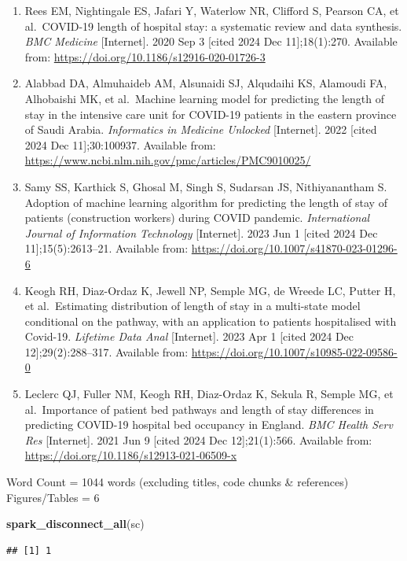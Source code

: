 \documentclass[
]{article}
\newenvironment{Shaded}{\begin{snugshade}}{\end{snugshade}}
\newcommand{\FunctionTok}[1]{\textcolor[rgb]{0.13,0.29,0.53}{\textbf{#1}}}
\newcommand{\NormalTok}[1]{#1}
\begin{document}
\begin{enumerate}
\def\labelenumi{\arabic{enumi}.}
\item
  Rees EM, Nightingale ES, Jafari Y, Waterlow NR, Clifford S, Pearson
  CA, et al.~COVID-19 length of hospital stay: a systematic review and
  data synthesis. \emph{BMC Medicine} {[}Internet{]}. 2020 Sep 3
  {[}cited 2024 Dec 11{]};18(1):270. Available from:
  \url{https://doi.org/10.1186/s12916-020-01726-3}
\item
  Alabbad DA, Almuhaideb AM, Alsunaidi SJ, Alqudaihi KS, Alamoudi FA,
  Alhobaishi MK, et al.~Machine learning model for predicting the length
  of stay in the intensive care unit for COVID-19 patients in the
  eastern province of Saudi Arabia. \emph{Informatics in Medicine
  Unlocked} {[}Internet{]}. 2022 {[}cited 2024 Dec 11{]};30:100937.
  Available from:
  \url{https://www.ncbi.nlm.nih.gov/pmc/articles/PMC9010025/}
\item
  Samy SS, Karthick S, Ghosal M, Singh S, Sudarsan JS, Nithiyanantham S.
  Adoption of machine learning algorithm for predicting the length of
  stay of patients (construction workers) during COVID pandemic.
  \emph{International Journal of Information Technology} {[}Internet{]}.
  2023 Jun 1 {[}cited 2024 Dec 11{]};15(5):2613--21. Available from:
  \url{https://doi.org/10.1007/s41870-023-01296-6}
\item
  Keogh RH, Diaz-Ordaz K, Jewell NP, Semple MG, de Wreede LC, Putter H,
  et al.~Estimating distribution of length of stay in a multi-state
  model conditional on the pathway, with an application to patients
  hospitalised with Covid-19. \emph{Lifetime Data Anal} {[}Internet{]}.
  2023 Apr 1 {[}cited 2024 Dec 12{]};29(2):288--317. Available from:
  \url{https://doi.org/10.1007/s10985-022-09586-0}
\item
  Leclerc QJ, Fuller NM, Keogh RH, Diaz-Ordaz K, Sekula R, Semple MG, et
  al.~Importance of patient bed pathways and length of stay differences
  in predicting COVID-19 hospital bed occupancy in England. \emph{BMC
  Health Serv Res} {[}Internet{]}. 2021 Jun 9 {[}cited 2024 Dec
  12{]};21(1):566. Available from:
  \url{https://doi.org/10.1186/s12913-021-06509-x}
\end{enumerate}

Word Count = 1044 words (excluding titles, code chunks \& references)
Figures/Tables = 6

\begin{Shaded}
\begin{Highlighting}[]
\FunctionTok{spark\_disconnect\_all}\NormalTok{(sc)}
\end{Highlighting}
\end{Shaded}

\begin{verbatim}
## [1] 1
\end{verbatim}
\end{document}

